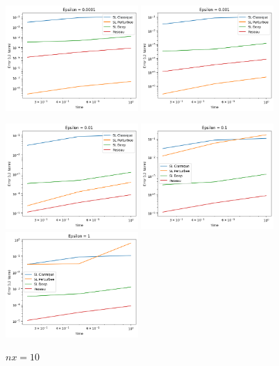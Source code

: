 \documentclass{article}
\begin{document}
\begin{figure}[!h]
    \centering
    \includegraphics[width=0.45\textwidth]{images/10ep11.png}
    \includegraphics[width=0.45\textwidth]{images/10ep12.png}
\end{figure}
\begin{figure}[!h]
    \centering 
    \includegraphics[width=0.45\textwidth]{images/10ep13.png}
    \includegraphics[width=0.45\textwidth]{images/10ep14.png}
    \includegraphics[width=0.45\textwidth]{images/10ep15.png}
    \caption{$nx = 10$}
\end{figure}
\end{document}
